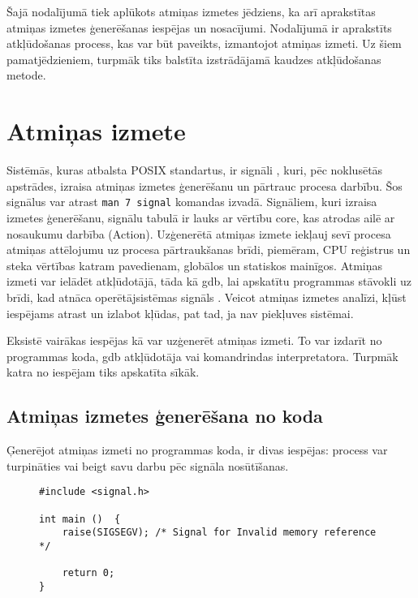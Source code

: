 ﻿Šajā nodalījumā tiek aplūkots atmiņas izmetes jēdziens, ka arī aprakstītas atmiņas izmetes ģenerēšanas iespējas un nosacījumi.
Nodalījumā ir aprakstīts atkļūdošanas process, kas var būt paveikts, izmantojot atmiņas izmeti.
Uz šiem pamatjēdzieniem, turpmāk tiks balstīta izstrādājamā kaudzes atkļūdošanas metode.
\section{Atmiņas izmete}

Sistēmās, kuras atbalsta POSIX standartus, ir signāli \cite{USP}, kuri, pēc noklusētās apstrādes, izraisa atmiņas izmetes ģenerēšanu un pārtrauc procesa darbību. 
Šos signālus var atrast  \texttt{man 7 signal} komandas izvadā. 
Signāliem, kuri izraisa izmetes ģenerēšanu, signālu tabulā \cite{signal} ir lauks ar vērtību core, kas atrodas ailē ar nosaukumu darbība (Action). 
Uzģenerētā atmiņas izmete iekļauj sevī procesa atmiņas attēlojumu uz procesa pārtraukšanas brīdi, piemēram, CPU reģistrus un steka vērtības katram pavedienam, globālos un statiskos mainīgos. 
Atmiņas izmeti var ielādēt atkļūdotājā, tāda kā gdb, lai  apskatītu programmas stāvokli uz brīdi, kad atnāca operētājsistēmas signāls \cite{core}.
Veicot atmiņas izmetes analīzi, kļūst iespējams atrast un izlabot kļūdas, pat tad, ja nav piekļuves sistēmai. 


Eksistē vairākas iespējas kā var uzģenerēt atmiņas izmeti.  To var izdarīt no programmas koda,  gdb atkļūdotāja vai komandrindas interpretatora. 
Turpmāk katra no iespējam tiks apskatīta sīkāk.

\subsection{Atmiņas izmetes ģenerēšana no koda}

Ģenerējot atmiņas izmeti no programmas koda, ir divas iespējas: process var turpināties vai beigt savu darbu pēc signāla nosūtīšanas.

\begin{figure}[h]
\begin{lstlisting}
#include <signal.h>

int main ()  {
    raise(SIGSEGV); /* Signal for Invalid memory reference */
	
    return 0;
}
\end{lstlisting}
\caption{\textbf{\fontsize{11}{12}\selectfont {Atmiņas izmetes ģenerēšana, pārtraucot procesa darbību}}}
\end{figure}

